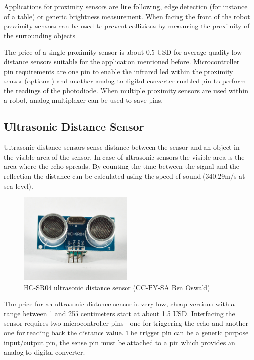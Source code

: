 Applications for proximity sensors are line following, edge detection (for instance of a table) or generic brightness measurement. When facing the front of the robot proximity sensors can be used to prevent collisions by measuring the proximity of the surrounding objects.

The price of a single proximity sensor is about 0.5 USD for average quality low distance sensors suitable for the application mentioned before. Microcontroller pin requirements are one pin to enable the infrared led within the proximity sensor (optional) and another analog-to-digital converter enabled pin to perform the readings of the photodiode. When multiple proximity sensors are used within a robot, analog multiplexer can be used to save pins. \cite[pp. 335]{niku2001introduction}

\subsection{Ultrasonic Distance Sensor}
Ultrasonic distance sensors sense distance between the sensor and an object in the visible area of the sensor. In case of ultrasonic sensors the visible area is the area where the echo spreads. By counting the time between the signal and the reflection the distance can be calculated using the speed of sound (340.29m/s at sea level). 

\begin{figure}[H]
  \centering
  \includegraphics[width=0.5\textwidth]{images/30_ultrasonic.jpg}
  \caption{HC-SR04 ultrasonic distance sensor (CC-BY-SA Ben Oswald)}
\end{figure}

The price for an ultrasonic distance sensor is very low, cheap versions with a range between 1 and 255 centimeters start at about 1.5 USD. Interfacing the sensor requires two microcontroller pins - one for triggering the echo and another one for reading back the distance value. The trigger pin can be a generic purpose input/output pin, the sense pin must be attached to a pin which provides an analog to digital converter.

